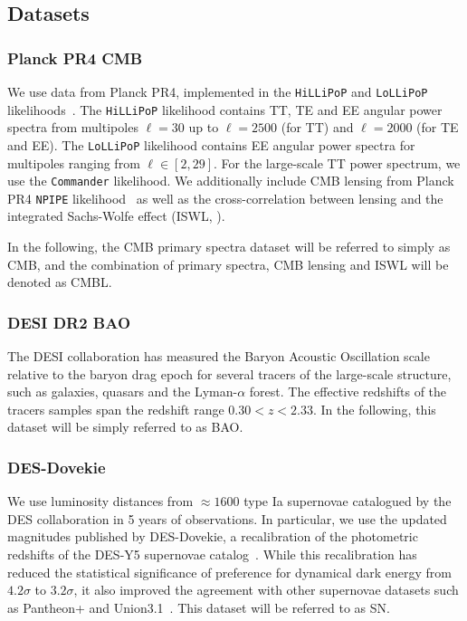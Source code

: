 \documentclass[%
reprint,
superscriptaddress,
preprint numbers,
nofootinbib,
amsmath,amssymb,
aps,
prd
]{revtex4-2}
\begin{document}
\subsection{Datasets}
\label{sec:datasets}

\subsubsection{Planck PR4 CMB}

We use data from Planck PR4, implemented in the \texttt{HiLLiPoP} and \texttt{LoLLiPoP} likelihoods~\cite{planck_pr4_results}. The \texttt{HiLLiPoP} likelihood contains TT, TE and EE angular power spectra from multipoles $\ell = 30$ up to $\ell = 2500$ (for TT) and $\ell = 2000$ (for TE and EE). The \texttt{LoLLiPoP} likelihood contains EE angular power spectra for multipoles ranging from $\ell \in [2, 29]$. For the large-scale TT power spectrum, we use the \texttt{Commander} likelihood. We additionally include CMB lensing from Planck PR4 \texttt{NPIPE} likelihood~\cite{planck_pr4_lensing} as well as the cross-correlation between lensing and the integrated Sachs-Wolfe effect (ISWL, \cite{planck_iswl}).

In the following, the CMB primary spectra dataset will be referred to simply as CMB, and the combination of primary spectra, CMB lensing and ISWL will be denoted as CMBL.

\subsubsection{DESI DR2 BAO}

The DESI collaboration has measured the Baryon Acoustic Oscillation scale relative to the baryon drag epoch for several tracers of the large-scale structure, such as galaxies, quasars and the Lyman-$\alpha$ forest. The effective redshifts of the tracers samples span the redshift range $0.30 < z < 2.33$. In the following, this dataset will be simply referred to as BAO.

\subsubsection{DES-Dovekie}

We use luminosity distances from $\approx 1600$ type Ia supernovae catalogued by the DES collaboration in 5 years of observations. In particular, we use the updated magnitudes published by DES-Dovekie, a recalibration of the photometric redshifts of the DES-Y5 supernovae catalog~\cite{des_dovekie}. While this recalibration has reduced the statistical significance of preference for dynamical dark energy from $4.2\sigma$ to $3.2\sigma$, it also improved the agreement with other supernovae datasets such as Pantheon+ and Union3.1~\cite{pantheonplus, union3-1}. This dataset will be referred to as SN.
\end{document}
